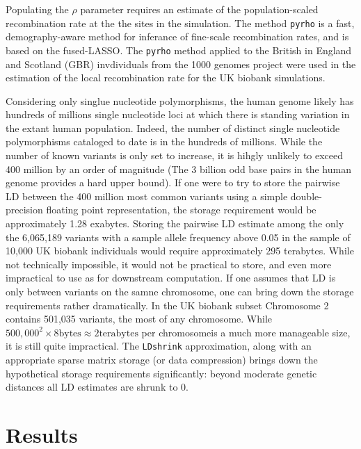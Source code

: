 Populating the \(\rho\) parameter requires an estimate of the population-scaled recombination rate at the the sites in the simulation.  The method \texttt{pyrho} is a fast, demography-aware method for inferance of fine-scale recombination rates, and is based on
the fused-LASSO\cite{Spence_2019}. The \texttt{pyrho} method applied to the British in England and Scotland (GBR) invdividuals from the 1000 genomes project\cite{1kg} were used in the estimation of the local recombination rate for the UK biobank simulations.


Considering only singlue nucleotide polymorphisms, the human genome likely has hundreds of millions single nucleotide loci at which there is standing variation in the extant human population\cite{1kg}.  Indeed, the
number of distinct single nucleotide polymorphisms cataloged to date is in the hundreds of millions\cite{1kg}.  While the number of known variants is only set to increase, it is hihgly unlikely to exceed 400 million by an order
of magnitude (The 3 billion odd base pairs in the human genome provides a hard upper bound).  If one were to try to store the pairwise LD between the 400 million most common variants using a simple double-precision floating point
representation, the storage requirement would be approximately 1.28 exabytes.  Storing the pairwise LD estimate among the only the 6,065,189 variants with a sample allele frequency above 0.05 in the sample of 10,000 UK biobank
individuals would require approximately 295 terabytes.  While not technically impossible, it would not be practical to store, and even more impractical to use as for downstream computation.  If one assumes that LD is only between
variants on the samne chromosome, one can bring down the storage requirements rather dramatically.  In the UK biobank subset Chromosome 2 contains 501,035 variants, the most of any chromosome.  While
$500,000^2 \times 8 \text{bytes} \approx 2\text{terabytes}$ per chromosomeis a much more manageable size, it is still quite impractical.  The \texttt{LDshrink} approximation, along with an appropriate sparse matrix storage (or data
compression) brings down the hypothetical storage requirements significantly: beyond moderate genetic distances all LD estimates are shrunk to 0.  

\section{Results}\label{sec:org26555b8}

